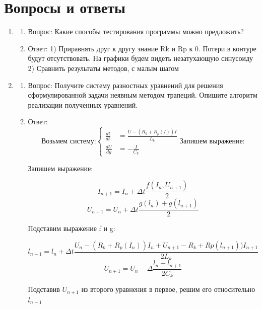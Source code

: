 \documentclass[12pt,a4paper]{scrartcl}
\begin{document}
\section{Вопросы и ответы}
	\begin{enumerate}
		\item \begin{enumerate}
			\item Вопрос: Какие способы тестирования программы можно предложить?
			\item Ответ: 1) Приравнять друг к другу знание Rk и Rp к 0. Потери в контуре будут отсутствовать. На графики будем видеть незатухающую синусоиду
			2) Сравнить результаты методов, с малым шагом
		\end{enumerate}
		\item \begin{enumerate}
			\item Вопрос: Получите систему разностных уравнений для решения
			сформулированной задачи неявным методом трапеций. Опишите
			алгоритм реализации полученных уравнений.
			\item Ответ:\begin{equation}
				\text{Возьмем систему:}
				\begin{cases}
					\frac{dl}{dt} & =\frac{U - (R_k + R_p(I))I}{L_k}\\
					\frac{dU}{dy} & =-\frac{I}{C_k}
				\end{cases}
				\text{Запишем выражение:}
			\end{equation}
			
			Запишем выражение:
			
			\begin{equation}
				I_{n+1} = I_n + \Delta t\frac{f(I_n, U_{n+1})}{2}
			\end{equation}
			\begin{equation}
				U_{n+1} = U_n + \Delta t\frac{g(l_n) + g(l_{n+1})}{2}
			\end{equation}
			
			Подставим выражение f и g:
			
			\begin{equation}
				l_{n + 1} = l_n + \Delta t\frac{U_n - (R_k + R_p(I_n))I_n + U_{n+1} - R_k + Rp(l_{n+1}))I_{n+1}}{2L_k}
			\end{equation}
			\begin{equation}
				U_{n+1} = U_n - \Delta\frac{l_n + l_{n+1}}{2C_k}
			\end{equation}
			
			Подставив $U_{n+1}$ из второго уравнения в первое, решим его относительно $l_{n+1}$
			

\end{enumerate}
\end{enumerate}
\end{document}
